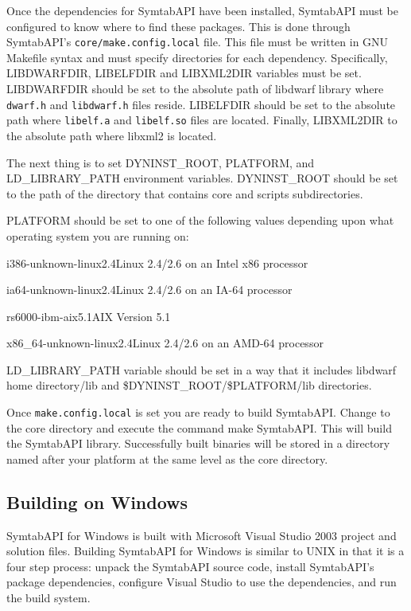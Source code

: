 Once the dependencies for SymtabAPI have been installed, SymtabAPI must be
configured to know where to find these packages. This is done through
SymtabAPI's \texttt{core/make.config.local} file. This file must be written in
GNU Makefile syntax and must specify directories for each dependency.
Specifically, LIBDWARFDIR, LIBELFDIR and LIBXML2DIR variables must be set.
LIBDWARFDIR should be set to the absolute path of libdwarf library where
\texttt{dwarf.h} and \texttt{libdwarf.h} files reside. LIBELFDIR should be set
to the absolute path where \texttt{libelf.a} and \texttt{libelf.so} files are
located. Finally, LIBXML2DIR to the absolute path where libxml2 is located.

The next thing is to set DYNINST\_ROOT, PLATFORM, and LD\_LIBRARY\_PATH
environment variables. DYNINST\_ROOT should be set to the path of the directory
that contains core and scripts subdirectories.

PLATFORM should be set to one of the following values depending upon what operating system you are running on:
\begin{description}
    \item i386-unknown-linux2.4Linux 2.4/2.6 on an Intel x86 processor
    \item ia64-unknown-linux2.4Linux 2.4/2.6 on an IA-64 processor
    \item rs6000-ibm-aix5.1AIX Version 5.1
    \item x86\_64-unknown-linux2.4Linux 2.4/2.6 on an AMD-64 processor
\end{description}

LD\_LIBRARY\_PATH variable should be set in a way that it includes libdwarf home
directory/lib and \${DYNINST\_ROOT}/\${PLATFORM}/lib directories.

Once \texttt{make.config.local} is set you are ready to build SymtabAPI. Change
to the core directory and execute the command make SymtabAPI. This will build
the SymtabAPI library. Successfully built binaries will be stored in a directory
named after your platform at the same level as the core directory. 

\subsection{Building on Windows}

SymtabAPI for Windows is built with Microsoft Visual Studio 2003 project and
solution files.   Building SymtabAPI for Windows is similar to UNIX in that it
is a four step process: unpack the SymtabAPI source code, install SymtabAPI's
package dependencies, configure Visual Studio to use the dependencies, and run
the build system. 


